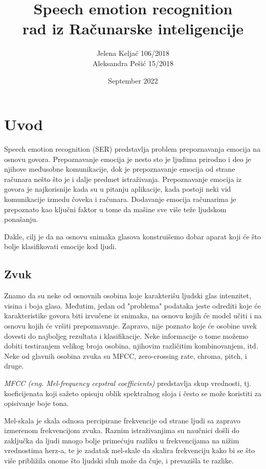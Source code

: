 \documentclass{article}
\title{Speech emotion recognition\\
    rad iz Računarske inteligencije}
\author{Jelena Keljać 106/2018\\
        Aleksandra Pešić 15/2018}
\date{September 2022}
\begin{document}

\maketitle
\newpage   

\renewcommand*\contentsname{Sadržaj}
\tableofcontents
\newpage

\section{Uvod}
Speech emotion recognition (SER) predstavlja problem prepoznavanja emocija na osnovu govora. Prepoznavanje emocija je nesto sto je ljudima prirodno i deo je njihove međusobne komunikacije, dok je prepoznavanje emocija od strane računara nešto što je i dalje predmet istraživanja. Prepoznavanje emocija iz govora je najkorisnije kada su u pitanju aplikacije, kada postoji neki vid komunikacije izmedu čoveka i računara. Dodavanje emocija računarima je prepoznato kao ključni faktor u tome da mašine sve više teže ljudskom ponašanju.

Dakle, cilj je da na osnovu snimaka glasova konstruišemo dobar aparat koji će što bolje klasifikovati emocije kod ljudi.

\subsection{Zvuk}
Znamo da su neke od osnovnih osobina koje karakterišu ljudski glas intenzitet, visina i boja glasa.
Međutim, jedan od "problema" podataka jeste odrediti koje će karakteristike govora biti izvučene iz snimaka, na osnovu kojih će model učiti i na osnovu kojih će vršiti prepoznavanje. Zapravo, nije poznato koje će osobine uvek dovesti do najboljeg rezultata i klasifikacije. Neke informacije o tome možemo dobiti testiranjem velikog broja osobina, njihovim različitim kombinovanjem, itd. Neke od glavnih osobina zvuka su MFCC, zero-crossing rate, chroma, pitch, i druge. 

\textit{MFCC (eng. Mel-frequency cepstral coefficients)} predstavlja skup vrednosti, tj. koeficijenata koji sažeto opisuju oblik spektralnog sloja i često se može koristiti za opisivanje boje tona.


Mel-skala je skala odnosa percipirane frekvencije od strane ljudi sa zapravo izmerenom frekvencijom zvuka. Raznim istraživanjima su naučnici došli do zaključka da ljudi mnogo bolje primećuju razliku u frekvencijama na nižim vrednostima herz-a, te je zadatak mel-skale da skalira frekvenciju kako bi se što više približila onome što ljudski sluh može da čuje, i prevazišla te razlike.
\end{document}
